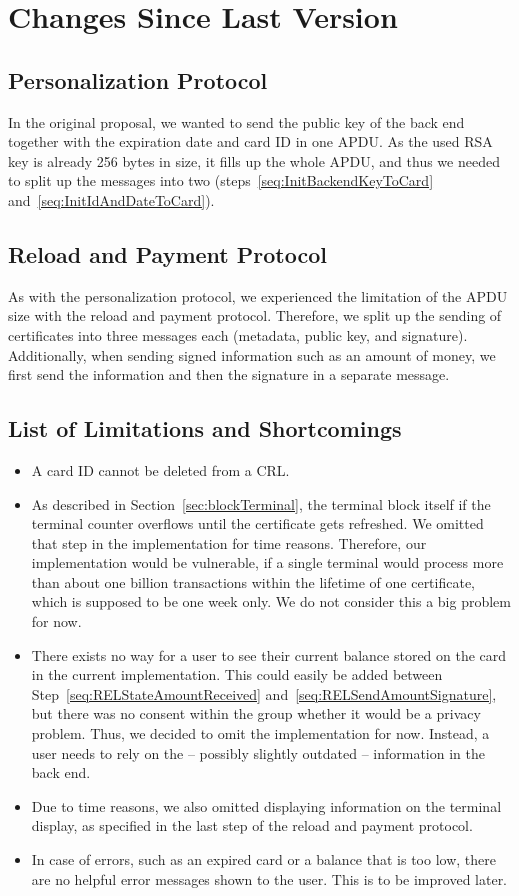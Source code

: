 \documentclass{article}
\begin{document}
\section{Changes Since Last Version}
    \subsection{Personalization Protocol}
    In the original proposal, we wanted to send the public key of the back end together with the expiration date and card ID in one APDU\@.
    As the used RSA key is already 256 bytes in size, it fills up the whole APDU, and thus we needed to split up the messages into two (steps~\ref{seq:InitBackendKeyToCard} and~\ref{seq:InitIdAndDateToCard}).

    \subsection{Reload and Payment Protocol}
    As with the personalization protocol, we experienced the limitation of the APDU size with the reload and payment protocol.
    Therefore, we split up the sending of certificates into three messages each (metadata, public key, and signature).
    Additionally, when sending signed information such as an amount of money, we first send the information and then the signature in a separate message.

    \subsection{List of Limitations and Shortcomings}
    \begin{itemize}
        \item A card ID cannot be deleted from a CRL\@.
        \item As described in Section~\ref{sec:blockTerminal}, the terminal block itself if the terminal counter overflows until the certificate gets refreshed.
        We omitted that step in the implementation for time reasons.
        Therefore, our implementation would be vulnerable, if a single terminal would process more than about one billion transactions within the lifetime of one certificate, which is supposed to be one week only.
        We do not consider this a big problem for now.
        \item There exists no way for a user to see their current balance stored on the card in the current implementation.
        This could easily be added between Step~\ref{seq:RELStateAmountReceived} and~\ref{seq:RELSendAmountSignature}, but there was no consent within the group whether it would be a privacy problem.
        Thus, we decided to omit the implementation for now.
        Instead, a user needs to rely on the -- possibly slightly outdated -- information in the back end.
        \item Due to time reasons, we also omitted displaying information on the terminal display, as specified in the last step of the reload and payment protocol.
        \item In case of errors, such as an expired card or a balance that is too low, there are no helpful error messages shown to the user.
        This is to be improved later.
    \end{itemize}
\end{document}
